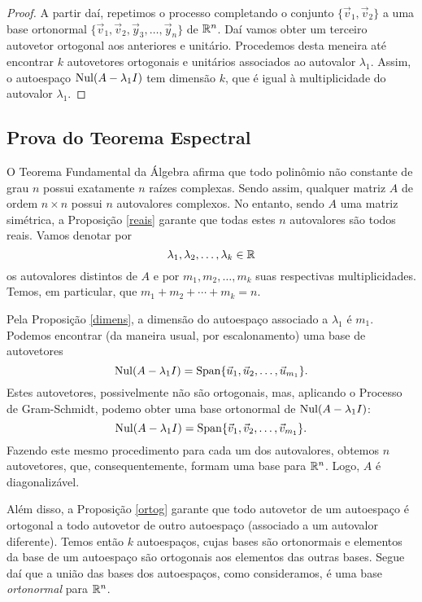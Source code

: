 \documentclass[../livro.tex]{subfiles}
\begin{document}
\begin{proof}
	A partir daí, repetimos o processo completando o conjunto $\{\vec{v}_1, \vec{v}_2\}$ a uma base ortonormal $\{ \vec{v}_1, \vec{v}_2, \vec{y}_3, \dots, \vec{y}_n \}$ de $\mathbb{R}^n$. Daí vamos obter um terceiro autovetor ortogonal aos anteriores e unitário. Procedemos desta meneira até encontrar $k$ autovetores ortogonais e unitários associados ao autovalor $\lambda_1$. Assim, o autoespaço $\operatorname{Nul} (A - \lambda_1 I)$ tem dimensão $k$, que é igual à multiplicidade do autovalor $\lambda_1$.
\end{proof}

\subsection{Prova do Teorema Espectral}

O Teorema Fundamental da Álgebra afirma que todo polinômio não constante de grau $n$ possui exatamente $n$ raízes complexas. Sendo assim, qualquer matriz $A$ de ordem $n\times n$ possui $n$ autovalores complexos. No entanto, sendo $A$ uma matriz simétrica, a Proposição \ref{reais} garante que todas estes $n$ autovalores são todos reais. Vamos denotar por
\[
\lambda_1, \lambda_2, \dots, \lambda_k \in \mathbb{R}
\] os autovalores distintos de $A$ e por $m_1, m_2, \dots, m_k$ suas respectivas multiplicidades. Temos, em particular, que $m_1 + m_2 + \cdots + m_k = n$.

Pela Proposição \ref{dimens}, a dimensão do autoespaço associado a $\lambda_1$ é $m_1$. Podemos encontrar (da maneira usual, por escalonamento) uma base de autovetores
\[
\operatorname{Nul} (A - \lambda_1 I) = \operatorname{Span} \{ \vec{u}_1, \vec{u}_2, \dots, \vec{u}_{m_1} \}.
\] Estes autovetores, possivelmente não são ortogonais, mas, aplicando o Processo de Gram-Schmidt, podemo obter uma base ortonormal de $\operatorname{Nul} (A - \lambda_1 I)$:
\[
\operatorname{Nul} (A - \lambda_1 I) = \operatorname{Span} \{ \vec{v}_1, \vec{v}_2, \dots, \vec{v}_{m_1} \}.
\] Fazendo este mesmo procedimento para cada um dos autovalores, obtemos $n$ autovetores, que, consequentemente, formam uma base para $\mathbb{R}^n$. Logo, $A$ é diagonalizável.

Além disso, a Proposição \ref{ortog} garante que todo autovetor de um autoespaço é ortogonal a todo autovetor de outro autoespaço (associado a um autovalor diferente). Temos então $k$ autoespaços, cujas bases são ortonormais e elementos da base de um autoespaço são ortogonais aos elementos das outras bases. Segue daí que a união das bases dos autoespaços, como consideramos, é uma base \textit{ortonormal} para $\mathbb{R}^n$.
\end{document}
